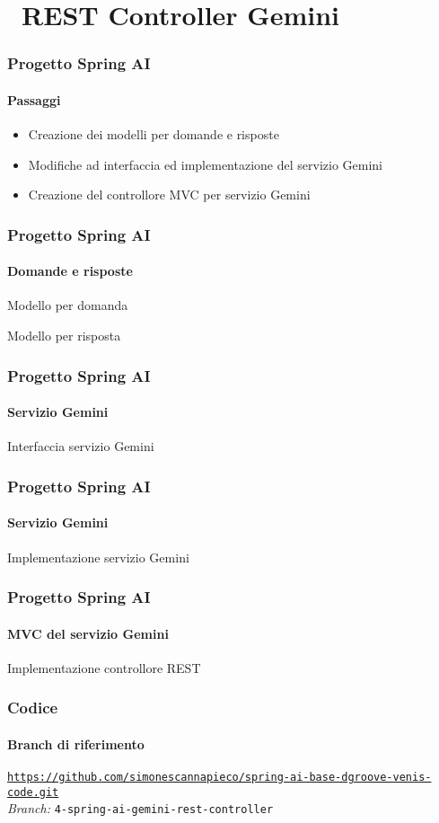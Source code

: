 \section{\faWrench\ REST Controller Gemini} %
\label{sec:spring-ai-gemini-rest-controller}
%
\begin{frame}[t,fragile] \frametitle{Progetto Spring AI}
    \framesubtitle{Passaggi}
	\begin{itemize}[leftmargin=10pt,align=right]
		\item[\alertedcircled{1}] Creazione dei modelli per domande e risposte
        \item[\alertedcircled{2}] Modifiche ad interfaccia ed implementazione del servizio Gemini
        \item[\alertedcircled{3}] Creazione del controllore MVC per servizio Gemini
	\end{itemize}        
\end{frame}
%
\begin{frame}[t,fragile] \frametitle{Progetto Spring AI}
    \framesubtitle{Domande e risposte}
        \begin{block}{Modello per domanda}
			{\tiny}
    	\end{block}
        \begin{block}{Modello per risposta}
			{\tiny}
    	\end{block}

\end{frame}
%
\begin{frame}[t,fragile] \frametitle{Progetto Spring AI}
    \framesubtitle{Servizio Gemini}
        \begin{block}{Interfaccia servizio Gemini}
{\tiny}
    \end{block}
\end{frame}
%
\begin{frame}[t,fragile] \frametitle{Progetto Spring AI}
    \framesubtitle{Servizio Gemini}
		\vspace*{-.7cm}
        \begin{block}{Implementazione servizio Gemini}
{\tiny}
    \end{block}
\end{frame}
%
\begin{frame}[t,fragile] \frametitle{Progetto Spring AI}
    \framesubtitle{MVC del servizio Gemini}
        \begin{block}{Implementazione controllore REST}
			{\tiny}
    	\end{block}
\end{frame}
%
\begin{frame}[fragile] \frametitle{Codice}
    \framesubtitle{Branch di riferimento}
	\begin{center}
		{\scriptsize \href{https://github.com/simonescannapieco/spring-ai-base-dgroove-venis-code.git}{\texttt{https://github.com/simonescannapieco/spring-ai-base-dgroove-venis-code.git}}}\\
		\textit{Branch:} \alert{\texttt{4-spring-ai-gemini-rest-controller}}
	\end{center}
\end{frame}